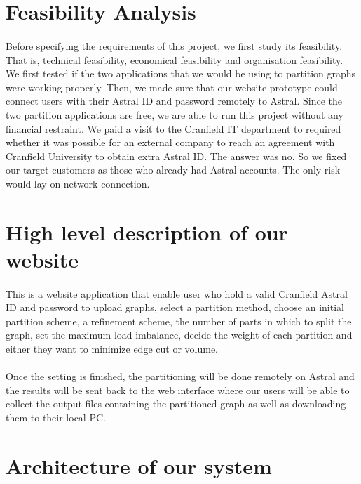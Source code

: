 \documentclass{cranfieldChart}
\begin{document}
\section{Feasibility Analysis} 
\paragraph{}
Before specifying the requirements of this project, we first study its feasibility. That is, technical feasibility, economical feasibility and organisation feasibility. We first tested if the two applications that we would be using to partition graphs were working properly. Then, we made sure that our website prototype could connect users with their Astral ID and password remotely to Astral. Since the two partition applications are free, we are able to run this project without any financial restraint. We paid a visit to the Cranfield IT department to required whether it was possible for an external company to reach an agreement with Cranfield University to obtain extra Astral ID. The answer was no. So we fixed our target customers as those who already had Astral accounts. The only risk would lay on network connection. 

\section{High level description of our website}
\paragraph{}
This is a website application that enable user who hold a valid Cranfield Astral ID and password to upload graphs, select a partition method, choose an initial partition scheme, a refinement scheme, the number of parts in which to split the graph, set the maximum load imbalance, decide the weight of each partition and either they want to minimize edge cut or volume. 
\paragraph{}
Once the setting is finished, the partitioning will be done remotely on Astral and the results will be sent back to the web interface where our users will be able to collect the output files containing the partitioned graph as well as downloading them to their local PC. 

\section{Architecture of our system}
\end{document}
